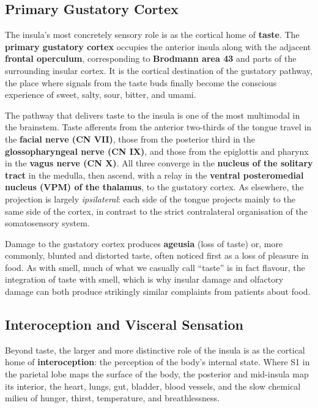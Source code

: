 \documentclass[11pt]{article}
\begin{document}
\subsection{Primary Gustatory Cortex}

The insula's most concretely sensory role is as the cortical home of \textbf{taste}. The \textbf{primary gustatory cortex} occupies the anterior insula along with the adjacent \textbf{frontal operculum}, corresponding to \textbf{Brodmann area 43} and parts of the surrounding insular cortex. It is the cortical destination of the gustatory pathway, the place where signals from the taste buds finally become the conscious experience of sweet, salty, sour, bitter, and umami.

The pathway that delivers taste to the insula is one of the most multimodal in the brainstem. Taste afferents from the anterior two-thirds of the tongue travel in the \textbf{facial nerve (CN VII)}, those from the posterior third in the \textbf{glossopharyngeal nerve (CN IX)}, and those from the epiglottis and pharynx in the \textbf{vagus nerve (CN X)}. All three converge in the \textbf{nucleus of the solitary tract} in the medulla, then ascend, with a relay in the \textbf{ventral posteromedial nucleus (VPM) of the thalamus}, to the gustatory cortex. As elsewhere, the projection is largely \textit{ipsilateral}: each side of the tongue projects mainly to the same side of the cortex, in contrast to the strict contralateral organisation of the somatosensory system.

Damage to the gustatory cortex produces \textbf{ageusia} (loss of taste) or, more commonly, blunted and distorted taste, often noticed first as a loss of pleasure in food. As with smell, much of what we casually call ``taste'' is in fact flavour, the integration of taste with smell, which is why insular damage and olfactory damage can both produce strikingly similar complaints from patients about food.

\subsection{Interoception and Visceral Sensation}

Beyond taste, the larger and more distinctive role of the insula is as the cortical home of \textbf{interoception}: the perception of the body's internal state. Where S1 in the parietal lobe maps the surface of the body, the posterior and mid-insula map its interior, the heart, lungs, gut, bladder, blood vessels, and the slow chemical milieu of hunger, thirst, temperature, and breathlessness.
\end{document}
